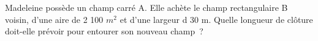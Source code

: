 \documentclass[exercice]{thedocument}%
\begin{document}
%
Madeleine possède un champ carré A. Elle achète le champ rectangulaire B
voisin, d'une aire de 2 100 $m^2$ et d'une largeur d 30 m. Quelle longueur de
clôture doit-elle prévoir pour entourer son nouveau champ~?
\vskip10pt{\centering
{}
\par}
\end{document}
